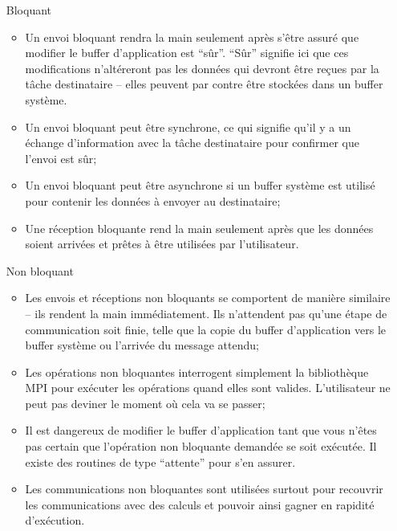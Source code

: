 \documentclass[11pt,a4paper]{article}
\begin{document}
\begin{itemize}
\item[Bloquant]
  \begin{itemize}
  \item Un envoi bloquant rendra la main seulement après s'être assuré que modifier le buffer d'application est ``sûr''.
``Sûr'' signifie ici que ces modifications n'altéreront pas les données qui devront être reçues par la tâche destinataire -- elles peuvent
par contre être stockées dans un buffer système.
\item Un envoi bloquant peut être synchrone, ce qui signifie qu'il y a un échange d'information avec la tâche destinataire pour
confirmer que l'envoi est sûr;
\item Un envoi bloquant peut être asynchrone si un buffer système est utilisé pour contenir les données à envoyer au destinataire;
\item Une réception bloquante rend la main seulement après que les données soient arrivées et prêtes à être utilisées par
l'utilisateur.
  \end{itemize}
\item[Non bloquant]
\begin{itemize}
\item Les envois et réceptions non bloquants se comportent de manière similaire -- ils rendent la main immédiatement. Ils n'attendent pas
qu'une étape de communication soit finie, telle que la copie du buffer d'application vers le buffer système ou l'arrivée du message attendu;
\item Les opérations non bloquantes interrogent simplement la bibliothèque MPI pour exécuter les opérations quand elles sont valides. L'utilisateur
ne peut pas deviner le moment où cela va se passer;
\item Il est dangereux de modifier le buffer d'application tant que vous n'êtes pas certain que l'opération non bloquante demandée se soit
exécutée. Il existe des routines de type ``attente'' pour s'en assurer.
\item Les communications non bloquantes sont utilisées surtout pour recouvrir les communications avec des calculs et pouvoir ainsi gagner
en rapidité d'exécution.
\end{itemize}
\end{itemize}
\end{document}
